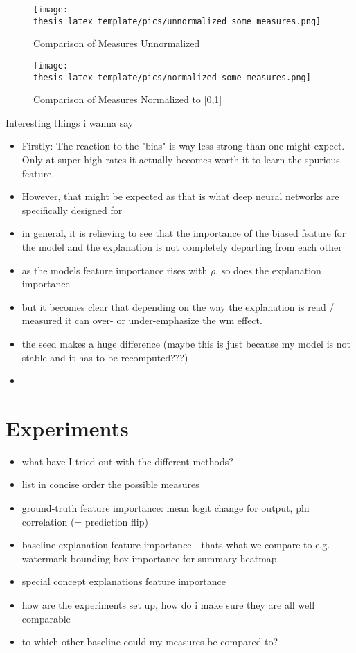 \begin{figure}[t!]
    \centering
    \texttt{[image: thesis\_latex\_template/pics/unnormalized\_some\_measures.png]}
    \caption{Comparison of Measures Unnormalized}
    \label{fig:unnormalized}
\end{figure}


\begin{figure}[t!]
    \centering
    \texttt{[image: thesis\_latex\_template/pics/normalized\_some\_measures.png]}
    \caption{Comparison of Measures Normalized to [0,1]}
    \label{fig:normalized}
\end{figure}


Interesting things i wanna say
\begin{itemize}
    \item Firstly: The reaction to the "bias" is way less strong than one might expect. Only at super high rates it actually becomes worth it to learn the spurious feature.
    \item However, that might be expected as that is what deep neural networks are specifically designed for
    \item in general, it is relieving to see that the importance of the biased feature for the model and the explanation is not completely departing from each other
    \item as the models feature importance rises with $\rho$, so does the explanation importance
    \item but it becomes clear that depending on the way the explanation is read / measured it can over- or under-emphasize the wm effect. 
    \item the seed makes a huge difference (maybe this is just because my model is not stable and it has to be recomputed???) 
    \item 
\end{itemize}

\section{Experiments}
\begin{itemize}
    \item what have I tried out with the different methods?
    \item list in concise order the possible measures
    \item ground-truth feature importance: mean logit change for output, phi correlation (= prediction flip)
    \item baseline explanation feature importance - thats what we compare to e.g. watermark bounding-box importance for summary heatmap
    \item special concept explanations feature importance
    \item how are the experiments set up, how do i make sure they are all well comparable
    \item to which other baseline could my measures be compared to?
\end{itemize}

